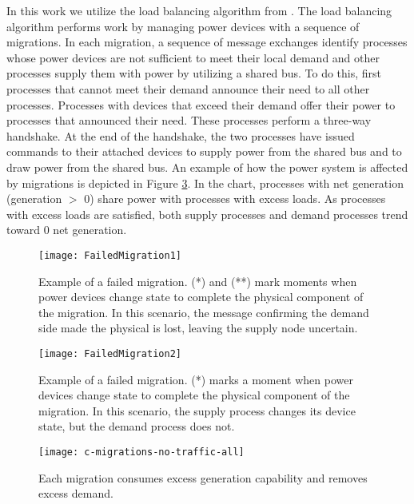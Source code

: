 In this work we utilize the load balancing algorithm from \cite{LOADBALANCING}.
The load balancing algorithm performs work by managing power devices with a sequence of migrations\cite{HILTESTBED}.
In each migration, a sequence of message exchanges identify processes whose power devices are not sufficient to meet their local demand and other processes supply them with power by utilizing a shared bus.
To do this, first processes that cannot meet their demand announce their need to all other processes.
Processes with devices that exceed their demand offer their power to processes that announced their need.
These processes perform a three-way handshake.
At the end of the handshake, the two processes have issued commands to their attached devices to supply power from the shared bus and to draw power from the shared bus.
An example of how the power system is affected by migrations is depicted in Figure \ref{fig:good-migrations}.
In the chart, processes with net generation (generation $>$ 0) share power with processes with excess loads.
As processes with excess loads are satisfied, both supply processes and demand processes trend toward 0 net generation.

\begin{figure}
\centering
\texttt{[image: FailedMigration1]}
\caption{Example of a failed migration. (*) and (**) mark moments when power devices change state to complete the physical component of the migration. In this scenario, the message confirming the demand side made the physical is lost, leaving the supply node uncertain.}
\label{fig:failed-migration-1}
\end{figure}

\begin{figure}
\centering
\texttt{[image: FailedMigration2]}
\caption{Example of a failed migration. (*) marks a moment when power devices change state to complete the physical component of the migration. In this scenario, the supply process changes its device state, but the demand process does not.}
\label{fig:failed-migration-2}
\end{figure}

\begin{figure}
\centering
\texttt{[image: c-migrations-no-traffic-all]}
\caption{Each migration consumes excess generation capability and removes excess demand.}
\label{fig:good-migrations}
\end{figure}

